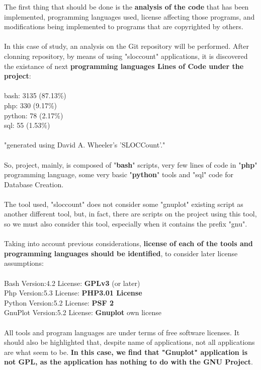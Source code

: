 \documentclass[11pt]{article}
\begin{document}
The first thing that should be done is the \textbf{analysis of the code} that has been implemented, programming languages used, license affecting those programs, and modifications being implemented to programs that are copyrighted by others.\\
\\
In this case of study, an analysis on the Git repository will be performed. After clonning repository, by means of using "sloccount" applications, it is discovered the existance of next \textbf{programming languages Lines of Code under the project}:\\
\\
bash:            3135 (87.13\%)\\
php:              330 (9.17\%)\\
python:            78 (2.17\%)\\
sql:               55 (1.53\%)\\
\\
"generated using David A. Wheeler's 'SLOCCount'."\\
\\
So, project, mainly, is composed of "\textbf{bash}" scripts, very few lines of code in "\textbf{php}" programming language, some very basic "\textbf{python}" tools and "sql" code for Database Creation.\\
\\
The tool used, "sloccount" does not consider some "gnuplot" existing script as another different tool,  but, in fact, there are scripts on the project using this tool, so we must also consider this tool, especially when it contains the prefix "gnu".\\
\\
Taking into account previous considerations, \textbf{license of each of the tools and programming languages should be identified}, to consider later license assumptions:\\
\\
Bash    Version:4.2  License: \textbf{GPLv3} (or later)\\
Php     Version:5.3  License: \textbf{PHP3.01 License}\\
Python  Version:5.2  License: \textbf{PSF 2}\\
GnuPlot Version:5.2  License: \textbf{Gnuplot} own license\\
\\
All tools and program languages are under terms of free software licenses. It should also be highlighted that, despite name of applications, not all applications are what seem to be. \textbf{In this case, we find that "Gnuplot" application is not GPL, as the application has nothing to do with the GNU Project}. \\
\end{document}

